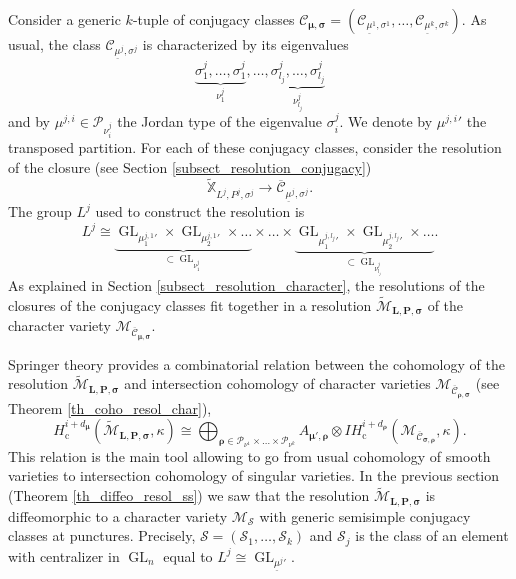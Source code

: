 \documentclass[11pt]{article}
\newcommand{\rc}{\mathrm{c}}
\theoremstyle{definition}
\theoremstyle{plain}
\DeclareMathOperator{\GL}{GL}
\newcommand{\IH}{\mathit{IH}}
\newcommand{\Part}{\mathcal{P}}
\newcommand{\mlps}{\widetilde{\mathcal{M}}_{\boldsymbol{L},\boldsymbol{P},\boldsymbol{\sigma}}}
\begin{document}
Consider a generic $k$-tuple of conjugacy classes $\mathcal{C}_{\boldsymbol{\mu},\boldsymbol{\sigma}} =(\mathcal{C}_{\underline{\mu}^1,\sigma^1}, \dots, \mathcal{C}_{\underline{\mu}^k,\sigma^k})$. As usual, the class $\mathcal{C}_{\underline{\mu}^j,\sigma^j}$ is characterized by its eigenvalues
\[
\underbrace{\sigma^j_1,\dots,\sigma^j_1}_{\nu^j_1},\dots,\underbrace{\sigma^j_{l_j},\dots, \sigma^j_{l_j}}_{\nu^j_{l_j}}
\]
and by $\mu^{j,i}\in \Part_{\nu^j_i}$ the Jordan type of the eigenvalue $\sigma^{j}_i$. We denote by ${\mu^{j,i}}'$ the transposed partition. For each of these conjugacy classes, consider the resolution of the closure (see Section \ref{subsect_resolution_conjugacy})
\[
\mathbb{\widetilde{X}}_{L^j, P^j, \sigma^j}\to \overline{\mathcal{C}}_{\underline{\mu}^j,\sigma^j}.
\]
The group $L^j$ used to construct the resolution is
\[
L^j \cong \underbrace{\GL_{ {\mu^{j,1}_1}'}\times \GL_{{\mu^{j,1}_2}'} \times \dots }_{\subset \GL_{\nu^j_1}}\times \dots \times \underbrace{\GL_{{\mu^{j,l_j}_1}'}\times \GL_{{\mu^{j,l_j}_2}'} \times \dots}_{\subset \GL_{\nu^j_{l_j}}}.
\]
As explained in Section \ref{subsect_resolution_character}, the resolutions of the closures of the conjugacy classes fit together in a resolution $\mlps$ of the character variety $\mathcal{M}_{\overline{\mathcal{C}}_{\boldsymbol{\mu},\boldsymbol{\sigma}}}$.

Springer theory provides a combinatorial relation between the cohomology of the resolution $\mlps$ and intersection cohomology of character varieties $\mathcal{M}_{\overline{\mathcal{C}}_{\boldsymbol{\rho},\boldsymbol{\sigma}}}$ (see Theorem \ref{th_coho_resol_char}),
\begin{equation}\label{eq_relation_cohom_resol}
H^{i+d_{\boldsymbol{\mu}}}_\rc
(\mlps,\kappa)
\cong
\bigoplus_{\boldsymbol{\rho}\in \Part_{\nu^1}\times\dots\times \Part_{\nu^k}}
A_{\boldsymbol{\mu'},\boldsymbol{\rho}}\otimes
\IH_{\rc}^{i+d_{\boldsymbol{\rho}}}(\mathcal{M}_{\overline{\mathcal{C}}_{\boldsymbol{\sigma},\boldsymbol{\rho}}},\kappa).
\end{equation}
This relation is the main tool allowing to go from usual cohomology of smooth varieties to intersection cohomology of singular varieties. In the previous section (Theorem \ref{th_diffeo_resol_ss}) we saw that the resolution $\mlps$ is diffeomorphic to a character variety $\mathcal{M}_{\boldsymbol{\mathcal{S}}}$ with generic semisimple conjugacy classes at punctures. Precisely, $\boldsymbol{\mathcal{S}}=\left(\mathcal{S}_1,\dots,\mathcal{S}_k\right)$ and $\mathcal{S}_j$ is the class of an element with centralizer in $\GL_n$ equal to $L^j\cong \GL_{{\underline{\mu}^j}'}$.
\end{document}
